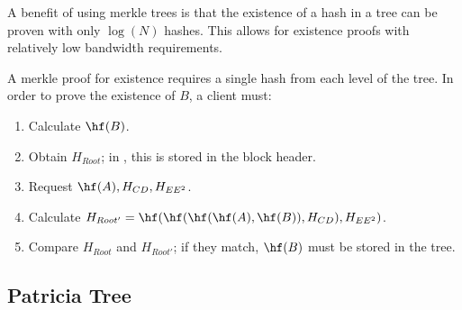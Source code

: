 \begin{figure}
\end{figure}

A benefit of using merkle trees is that the existence of a hash in a tree can be proven with only $\log(N)$ hashes.
This allows for existence proofs with relatively low bandwidth requirements.

A merkle proof for existence requires a single hash from each level of the tree.
In order to prove the existence of $B$, a client must:
\begin{enumerate}
	\item{Calculate $\hf(B)$.}
	\item{Obtain $H_{Root}$; in \codename, this is stored in the block header.}
	\item{Request $\hf(A), H_{CD}, H_{EE^2}$.}
	\item{Calculate $H_{Root'} = \hf(\hf(\hf(\hf(A), \hf(B)), H_{CD}), H_{EE^2})$.}
	\item{Compare $H_{Root}$ and $H_{Root'}$; if they match, $\hf(B)$ must be stored in the tree.}
\end{enumerate}

\subsection{Patricia Tree}
\label{sec:trees:patricia}

